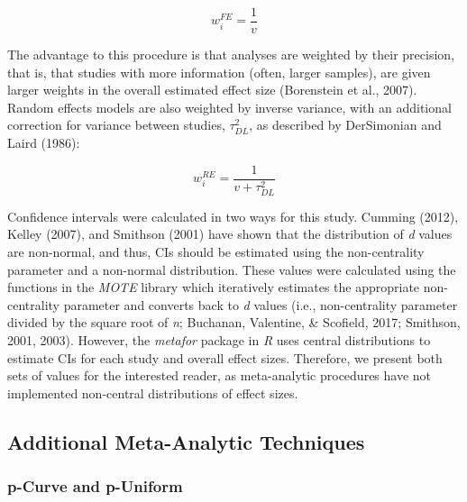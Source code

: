 \documentclass[english,man, mask]{apa6}
\theoremstyle{definition}
\theoremstyle{definition}
\theoremstyle{definition}
\theoremstyle{remark}
\begin{document}
\[
w_{i}^{FE} = \frac {1} {v}
\]

The advantage to this procedure is that analyses are weighted by their
precision, that is, that studies with more information (often, larger
samples), are given larger weights in the overall estimated effect size
(Borenstein et al., 2007). Random effects models are also weighted by
inverse variance, with an additional correction for variance between
studies, \(\tau^2_{DL}\), as described by DerSimonian and Laird (1986):

\[
w_{i}^{RE} = \frac {1} {v + \tau^2_{DL}}
\]

Confidence intervals were calculated in two ways for this study. Cumming
(2012), Kelley (2007), and Smithson (2001) have shown that the
distribution of \emph{d} values are non-normal, and thus, CIs should be
estimated using the non-centrality parameter and a non-normal
distribution. These values were calculated using the functions in the
\emph{MOTE} library which iteratively estimates the appropriate
non-centrality parameter and converts back to \emph{d} values (i.e.,
non-centrality parameter divided by the square root of \emph{n};
Buchanan, Valentine, \& Scofield, 2017; Smithson, 2001, 2003). However,
the \emph{metafor} package in \emph{R} uses central distributions to
estimate CIs for each study and overall effect sizes. Therefore, we
present both sets of values for the interested reader, as meta-analytic
procedures have not implemented non-central distributions of effect
sizes.

\subsection{Additional Meta-Analytic
Techniques}\label{additional-meta-analytic-techniques}

\subsubsection{p-Curve and p-Uniform}\label{p-curve-and-p-uniform}
\end{document}
